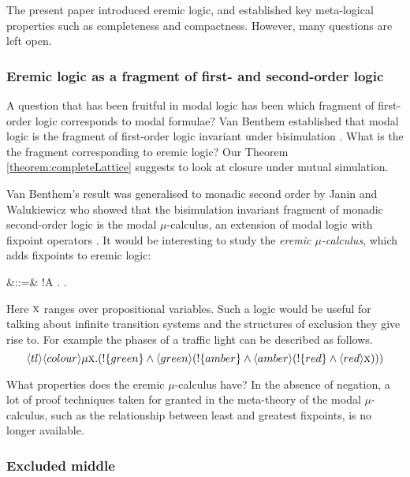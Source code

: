 The present paper introduced eremic logic, and established key
meta-logical properties such as completeness and compactness. However,
many questions are left open. 

\subsubsection{Eremic logic as a fragment of first- and second-order logic }

A question that has been fruitful in modal logic has been which
fragment of first-order logic corresponds to modal formulae?  Van
Benthem established that modal logic is the fragment of first-order
logic invariant under bisimulation \cite{BlackburnP:modlog}. What is
the the fragment corresponding to eremic logic? Our Theorem
\ref{theorem:completeLattice} suggests to look at closure under mutual
simulation.  

Van Benthem's result was generalised to monadic second
order by Janin and Walukiewicz \cite{JaninD:expcomotpmcwrtmsol} who
showed that the bisimulation invariant fragment of monadic
second-order logic is the modal $\mu$-calculus, an extension of modal
logic with fixpoint operators \cite{KozenD:respromc}.  It would be
interesting to study the \emph{eremic $\mu$-calculus}, which adds
fixpoints to eremic logic:
\begin{GRAMMAR}
  \phi
     &::=&
  \TRUE
     \VERTICAL
  \phi \AND \psi
     \VERTICAL
  \phi
     \VERTICAL
  !A
     \VERTICAL
  \mu {}.\phi
     \VERTICAL
  \nu {}.\phi
     \VERTICAL
\end{GRAMMAR}

\NI Here $\text{\textsc{x}}$ ranges over propositional variables.  Such a logic
would be useful for talking about infinite transition systems and the
structures of exclusion they give rise to.  For example the phases of
a traffic light can be described as follows.
\[
   \langle tl \rangle \langle colour \rangle \mu \text{\textsc{x}}.
       (!\{green\} \land \langle green \rangle 
         (!\{amber\} \land \langle amber \rangle 
           (!\{red\} \land \langle red \rangle \text{\textsc{x}})))
\]

 What properties does the
eremic $\mu$-calculus have? In the absence of negation, a lot of proof
techniques taken for granted in the meta-theory of the modal
$\mu$-calculus, such as the relationship between least and greatest
fixpoints, is no longer available.

\subsubsection{Excluded middle}

